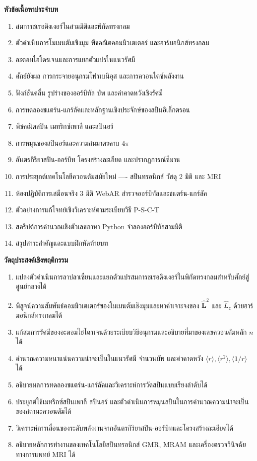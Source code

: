 \begin{lessonplanbox}
\noindent\textbf{หัวข้อเนื้อหาประจำบท}
\begin{enumerate}
    \item สมการชเรอดิงเงอร์ในสามมิติและพิกัดทรงกลม
    \item ตัวดำเนินการโมเมนตัมเชิงมุม พีชคณิตคอมมิวเตเตอร์ และฮาร์มอนิกส์ทรงกลม
    \item อะตอมไฮโดรเจนและการแยกตัวแปรในแนวรัศมี
    \item ศักย์ยังผล การกระจายอนุกรมโฟรเบนิอุส และการควอนไตซ์พลังงาน
    \item ฟังก์ชันคลื่น รูปร่างของออร์บิทัล บัพ และค่าคาดหวังเชิงรัศมี
    \item การทดลองชแตร์น-แกร์ลัคและหลักฐานเชิงประจักษ์ของสปินอิเล็กตรอน
    \item พีชคณิตสปิน เมทริกซ์เพาลี และสปินอร์
    \item การหมุนของสปินอร์และความสมมาตรคาบ $4\pi$
    \item อันตรกิริยาสปิน-ออร์บิท โครงสร้างละเอียด และปรากฏการณ์ซีมาน
    \item การประยุกต์เทคโนโลยีควอนตัมสมัยใหม่ ---- สปินทรอนิกส์ วัสดุ 2 มิติ และ MRI
    \item ห้องปฏิบัติการเสมือนจริง 3 มิติ WebAR สำรวจออร์บิทัลและชแตร์น-แกร์ลัค
    \item ตัวอย่างการแก้โจทย์เชิงวิเคราะห์ตามระเบียบวิธี P-S-C-T
    \item สคริปต์การคำนวณเชิงตัวเลขภาษา Python จำลองออร์บิทัลสามมิติ
    \item สรุปสาระสำคัญและแบบฝึกหัดท้ายบท
\end{enumerate}

\noindent\textbf{วัตถุประสงค์เชิงพฤติกรรม}
\begin{enumerate}
    \item แปลงตัวดำเนินการลาปลาเซียนและแยกตัวแปรสมการชเรอดิงเงอร์ในพิกัดทรงกลมสำหรับศักย์สู่ศูนย์กลางได้
    \item พิสูจน์ความสัมพันธ์คอมมิวเตเตอร์ของโมเมนตัมเชิงมุมและหาค่าเจาะจงของ $\hat{\mathbf{L}}^2$ และ $\hat{L}_z$ ด้วยฮาร์มอนิกส์ทรงกลมได้
    \item แก้สมการรัศมีของอะตอมไฮโดรเจนด้วยระเบียบวิธีอนุกรมและอธิบายที่มาของเลขควอนตัมหลัก $n$ ได้
    \item คำนวณความหนาแน่นความน่าจะเป็นในแนวรัศมี จำนวนบัพ และค่าคาดหวัง $\langle r \rangle, \langle r^2 \rangle, \langle 1/r \rangle$ ได้
    \item อธิบายผลการทดลองชแตร์น-แกร์ลัคและวิเคราะห์การวัดสปินแบบเรียงลำดับได้
    \item ประยุกต์ใช้เมทริกซ์สปินเพาลี สปินอร์ และตัวดำเนินการหมุนสปินในการคำนวณความน่าจะเป็นของสถานะควอนตัมได้
    \item วิเคราะห์การเลื่อนของระดับพลังงานจากอันตรกิริยาสปิน-ออร์บิทและโครงสร้างละเอียดได้
    \item อธิบายหลักการทำงานของเทคโนโลยีสปินทรอนิกส์ GMR, MRAM และเครื่องตรวจวินิจฉัยทางการแพทย์ MRI ได้
\end{enumerate}
\end{lessonplanbox}

